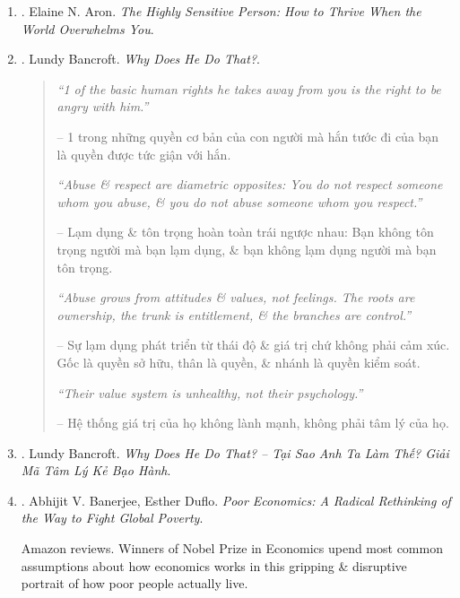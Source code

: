 \documentclass{article}
\begin{document}
\begin{enumerate}
	\item \cite{Aron_HSP}. Elaine N. Aron. {\it The Highly Sensitive Person: How to Thrive When the World Overwhelms You}.\hfill{\sf[done]}
	
	\item \cite{Bancroft_why_he_do}. Lundy Bancroft. {\it Why Does He Do That?}.\hfill{\sf[reading]}
	\begin{quotation}
		{\it``1 of the basic human rights he takes away from you is the right to be angry with him.''}
		
		-- 1 trong những quyền cơ bản của con người mà hắn tước đi của bạn là quyền được tức giận với hắn.
		
		{\it``Abuse \& respect are diametric opposites: You do not respect someone whom you abuse, \& you do not abuse someone whom you respect.''}
		
		-- Lạm dụng \& tôn trọng hoàn toàn trái ngược nhau: Bạn không tôn trọng người mà bạn lạm dụng, \& bạn không lạm dụng người mà bạn tôn trọng.
		
		{\it``Abuse grows from attitudes \& values, not feelings. The roots are ownership, the trunk is entitlement, \& the branches are control.''}
		
		-- Sự lạm dụng phát triển từ thái độ \& giá trị chứ không phải cảm xúc. Gốc là quyền sở hữu, thân là quyền, \& nhánh là quyền kiểm soát.
		
		{\it``Their value system is unhealthy, not their psychology.''}
		
		-- Hệ thống giá trị của họ không lành mạnh, không phải tâm lý của họ.
	\end{quotation}
	
	\item \cite{Bancroft_why_he_do_VN}. Lundy Bancroft. {\it Why Does He Do That? -- Tại Sao Anh Ta Làm Thế? Giải Mã Tâm Lý Kẻ Bạo Hành}.\hfill{\sf[done]}
	
	\item \cite{Banerjee_Duflo_poor_economics}. {\sc Abhijit V. Banerjee, Esther Duflo}. {\it Poor Economics: A Radical Rethinking of the Way to Fight Global Poverty}. {}
	
	{\sf Amazon reviews.} Winners of Nobel Prize in Economics upend most common assumptions about how economics works in this gripping \& disruptive portrait of how poor people actually live.
	

\end{enumerate}
\end{document}
